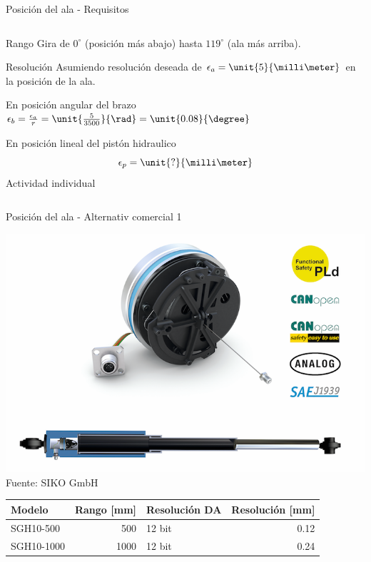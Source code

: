 \documentclass[presentation,aspectratio=169]{beamer}
\begin{document}
\begin{frame}[label={sec:org4c92ef2}]{Posición del ala - Requisitos}
\begin{columns}
\begin{column}{0.5\columnwidth}
\begin{block}{Rango}
Gira de \(0^\circ\) (posición más abajo) hasta \(119^\circ\) (ala más arriba).
\end{block}

\begin{block}{Resolución}
Asumiendo resolución deseada de \(\epsilon_a = \unit{5}{\milli\meter}\) en la posición de la ala.

\begin{block}{En posición angular del brazo}
\(\epsilon_b = \frac{\epsilon_a}{r} = \unit{\frac{5}{3500}}{\rad} = \unit{0.08}{\degree}\)
\end{block}
\begin{block}{En posición lineal del pistón hidraulico}
\[ \epsilon_p = \unit{?}{\milli\meter}\]
\alert{Actividad individual}
\end{block}
\end{block}
\end{column}
\end{columns}
\end{frame}

\begin{frame}[label={sec:orgf840a0a}]{Posición del ala - Alternativ comercial 1}
\begin{center}
\includegraphics[width=0.4\linewidth]{../../figures/PosSensor.png}\\
{\footnotesize Fuente: SIKO GmbH}
\end{center}

\begin{center}
\begin{tabular}{lrlr}
Modelo & Rango [mm] & Resolución DA & Resolución [mm]\\
\hline
SGH10-500 & 500 & 12 bit & 0.12\\
SGH10-1000 & 1000 & 12 bit & 0.24\\
\end{tabular}
\end{center}
\end{frame}
\end{document}
